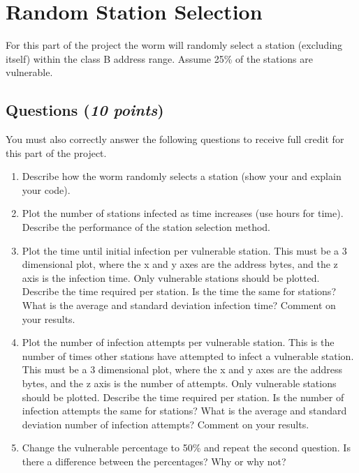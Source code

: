 \documentclass[10pt]{article}
\newcommand{\Section}[1]{
\noindent
\hrulefill
\vspace{-0.15in}
\section{#1}
}
\newcommand{\Questions}[1]{
\subsection*{Questions {\rm \normalsize (\textsf{\textit{#1 points}})}}
}
\begin{document}


\Section{Random Station Selection}

For this part of the project the worm will randomly select a
station (excluding itself) within the class B address range.
Assume 25\% of the stations are vulnerable.

\Questions{10}
You must also correctly answer the following questions to receive
full credit for this part of the project.
\begin{enumerate}
  \item Describe how the worm randomly selects a
station (show your and explain your code).

  \item Plot the number of stations infected as time increases
(use hours for time). Describe the performance of the station
selection method.

  \item Plot the time until initial infection per vulnerable station. This
must be a 3 dimensional plot, where the x and y axes are the
address bytes, and the z axis is the infection time. Only
vulnerable stations should be plotted. Describe the time required
per station. Is the time the same for stations? What is the
average and standard deviation infection time? Comment on your
results.

  \item Plot the number of infection attempts per vulnerable
station. This is the number of times other stations have attempted
to infect a vulnerable station. This must be a 3 dimensional plot,
where the x and y axes are the address bytes, and the z axis is
the number of attempts. Only vulnerable stations should be
plotted. Describe the time required per station. Is the number of
infection attempts the same for stations? What is the average and
standard deviation number of  infection attempts? Comment on your
results.

   \item Change the vulnerable percentage to 50\% and repeat the
 second question. Is there a difference between the
percentages? Why or why not?
\end{enumerate}
\end{document}
